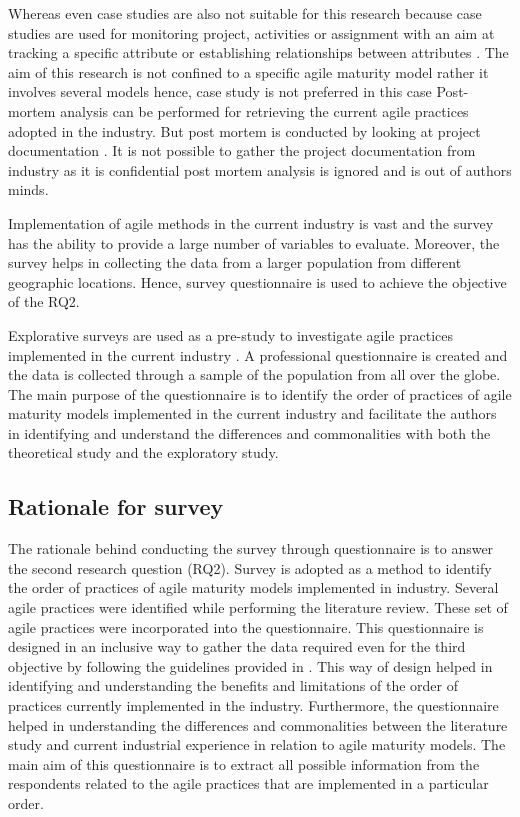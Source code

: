 \documentclass[a4paper,oneside]{bth}
\begin{document}
Whereas even case studies are also not suitable for this research because case studies are used for monitoring project, activities or assignment with an aim at tracking a specific attribute or establishing relationships between attributes \cite{wohlin_empirical_2003}. The aim of this research is not confined to a specific agile maturity model rather it involves several models hence, case study is not preferred in this case
Post-mortem analysis can be performed for retrieving the current agile practices adopted in the industry. But post mortem is conducted by looking at project documentation \cite{wohlin_empirical_2003}.  It is not possible to gather the project documentation from industry as it is confidential post mortem analysis is ignored and is out of authors minds. 

Implementation of agile methods in the current industry is vast and the survey has the ability to provide a large number of variables to evaluate. Moreover, the survey helps in collecting the data from a larger population from different geographic locations. Hence, survey questionnaire is used to achieve the objective of the RQ2.

Explorative surveys are used as a pre-study to investigate agile practices implemented in the current industry \cite{robson_real_2016}. A professional questionnaire is created and the data is collected through a sample of the population from all over the globe. The main purpose of the questionnaire is to identify the order of practices of agile maturity models implemented in the current industry and facilitate the authors in identifying and understand the differences and commonalities with both the theoretical study and the exploratory study.
\subsection{Rationale for survey}
The rationale behind conducting the survey through questionnaire is to answer the second research question (RQ2). Survey is adopted as a method to identify the order of practices of agile maturity models implemented in industry. Several agile practices were identified while performing the literature review. These set of agile practices were incorporated into the questionnaire. This questionnaire is designed in an inclusive way to gather the data required even for the third objective by following the guidelines provided in \cite{fink_survey_2003}. This way of design helped in identifying and understanding the benefits and limitations of the order of practices currently implemented in the industry. Furthermore, the questionnaire helped in understanding the differences and commonalities between the literature study and current industrial experience in relation to agile maturity models. The main aim of this questionnaire is to extract all possible information from the respondents related to the agile practices that are implemented in a particular order.
\end{document}
